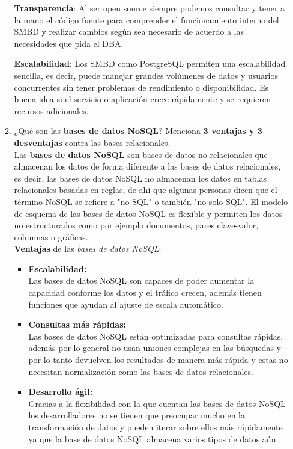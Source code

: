\documentclass[12pt]{report}
\begin{document}
\begin{enumerate}[label=\roman*.]
\begin{enumerate}[label=\textbf{\arabic*.}, itemsep=2.0em]
\textbf{Transparencia}: Al ser open source siempre podemos consultar y tener a la mano el código fuente para comprender el funcionamiento interno del SMBD y realizar cambios según sea necesario de acuerdo a las necesidades que pida el DBA.

\textbf{Escalabilidad}: Los SMBD como PostgreSQL permiten una escalabilidad sencilla, es decir, puede manejar grandes volúmenes de datos y usuarios concurrentes sin tener problemas de rendimiento o disponibilidad. Es buena idea si el servicio o aplicación crece rápidamente y se requieren recursos adicionales.

  \item ¿Qué son las \textbf{bases de datos NoSQL}? Menciona \textbf{3 ventajas y 3 desventajas} contra las bases relacionales.\\
  Las \textbf{bases de datos NoSQL} son bases de datos no relacionales que almacenan los datos de forma diferente a las bases de datos
  relacionales, es decir, las bases de datos NoSQL no almacenan los datos en tablas relacionales basadas en reglas, de ahí que algunas
  personas dicen que el término NoSQL se refiere a "no SQL" o también "no solo SQL". El modelo de esquema de las bases de datos NoSQL es
  flexible y permiten los datos no estructurados como por ejemplo documentos, pares clave-valor, columnas o gráficas.\\
  \textbf{Ventajas} de las \textit{bases de datos NoSQL}:
  \begin{itemize}
      \item \textbf{Escalabilidad:\\}
      Las bases de datos NoSQL son capaces de poder aumentar la capacidad conforme los datos y el tráfico crecen, además tienen funciones
      que ayudan al ajuste de escala automático.
      \item \textbf{Consultas más rápidas:\\}
      Las bases de datos NoSQL están optimizadas para consultas rápidas, además por lo general no usan uniones complejas en las búsquedas
      y por lo tanto devuelven los resultados de manera más rápida y estas no necesitan normalización como las bases de datos relacionales.
      \item \textbf{Desarrollo ágil:\\}
      Gracias a la flexibilidad con la que cuentan las bases de datos NoSQL los desarrolladores no se tienen que preocupar mucho en la
      transformación de datos y pueden iterar sobre ellos más rápidamente ya que la base de datos NoSQL almacena varios tipos de datos aún

\end{itemize}
\end{enumerate}
\end{enumerate}
\end{document}
